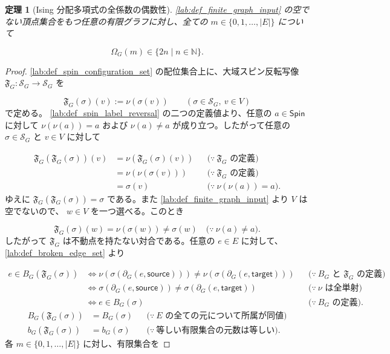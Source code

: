 \documentclass[11pt,a4paper]{article}
\newtheorem{theorem}[definition]{定理}
\theoremstyle{remark}
\begin{document}
\begin{theorem}[Ising 分配多項式の全係数の偶数性]\label{lab:theorem_partition_polynomial_coefficient_evenness}
\cref{lab:def_finite_graph_input}
 の空でない頂点集合をもつ任意の有限グラフに対し、全ての 
$m\in\{0,1,\ldots,|E|\}$
 について

\[\Omega_G(m)\in\{2n\mid n\in\mathbb N\}.\]
\end{theorem}
\begin{proof}
\cref{lab:def_spin_configuration_set}
 の配位集合上に、大域スピン反転写像 
$\mathfrak F_G:\mathcal S_G\to\mathcal S_G$
 を

\[\mathfrak F_G(\sigma)(v):=\nu(\sigma(v))
\qquad(\sigma\in\mathcal S_G,\ v\in V)\]
で定める。
\cref{lab:def_spin_label_reversal}
 の二つの定義値より、任意の 
$a\in\mathsf{Spin}$
 に対して 
$\nu(\nu(a))=a$
 および 
$\nu(a)\ne a$
 が成り立つ。したがって任意の 
$\sigma\in\mathcal S_G$
 と 
$v\in V$
 に対して

\[\begin{aligned}
\mathfrak F_G(\mathfrak F_G(\sigma))(v)
&=\nu(\mathfrak F_G(\sigma)(v))
&&\bigl(\because\ \mathfrak F_G\text{ の定義}\bigr)\\
&=\nu(\nu(\sigma(v)))
&&\bigl(\because\ \mathfrak F_G\text{ の定義}\bigr)\\
&=\sigma(v)
&&\bigl(\because\ \nu(\nu(a))=a\bigr).
\end{aligned}\]
ゆえに 
$\mathfrak F_G(\mathfrak F_G(\sigma))=\sigma$
 である。また 
\cref{lab:def_finite_graph_input}
 より 
$V$
 は空でないので、
$w\in V$
 を一つ選べる。このとき

\[\mathfrak F_G(\sigma)(w)
=\nu(\sigma(w))
\ne\sigma(w)
\quad\bigl(\because\ \nu(a)\ne a\bigr).\]
したがって 
$\mathfrak F_G$
 は不動点を持たない対合である。任意の 
$e\in E$
 に対して、
\cref{lab:def_broken_edge_set}
 より

\[\begin{aligned}
e\in B_G(\mathfrak F_G(\sigma))
&\iff
\nu\!\left(\sigma\!\left(\partial_G(e,\mathsf{source})\right)\right)
\ne
\nu\!\left(\sigma\!\left(\partial_G(e,\mathsf{target})\right)\right)
&&\bigl(\because\ B_G\text{ と }\mathfrak F_G\text{ の定義}\bigr)\\
&\iff
\sigma\!\left(\partial_G(e,\mathsf{source})\right)
\ne
\sigma\!\left(\partial_G(e,\mathsf{target})\right)
&&\bigl(\because\ \nu\text{ は全単射}\bigr)\\
&\iff e\in B_G(\sigma)
&&\bigl(\because\ B_G\text{ の定義}\bigr).
\end{aligned}\]
\[\begin{aligned}
B_G(\mathfrak F_G(\sigma))
&=B_G(\sigma)
&&\bigl(\because\ E\text{ の全ての元について所属が同値}\bigr)\\
b_G(\mathfrak F_G(\sigma))
&=b_G(\sigma)
&&\bigl(\because\ \text{等しい有限集合の元数は等しい}\bigr).
\end{aligned}\]
各 
$m\in\{0,1,\ldots,|E|\}$
 に対し、有限集合を


\end{proof}
\end{document}
